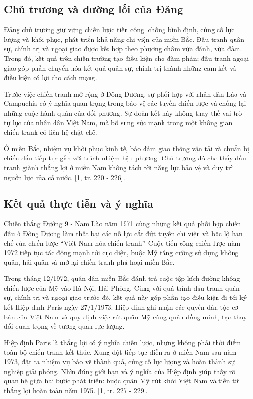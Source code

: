 \subsection{Chủ trương và đường lối của Đảng}

Đảng chủ trương giữ vững chiến lược tiến công, chống bình định, củng cố lực lượng và khôi phục, phát triển khả năng chi viện của miền Bắc. Đấu tranh quân sự, chính trị và ngoại giao được kết hợp theo phương châm vừa đánh, vừa đàm. Trong đó, kết quả trên chiến trường tạo điều kiện cho đàm phán; đấu tranh ngoại giao góp phần chuyển hóa kết quả quân sự, chính trị thành những cam kết và điều kiện có lợi cho cách mạng.

Trước việc chiến tranh mở rộng ở Đông Dương, sự phối hợp với nhân dân Lào và Campuchia có ý nghĩa quan trọng trong bảo vệ các tuyến chiến lược và chống lại những cuộc hành quân của đối phương. Sự đoàn kết này không thay thế vai trò tự lực của nhân dân Việt Nam, mà bổ sung sức mạnh trong một không gian chiến tranh có liên hệ chặt chẽ.

Ở miền Bắc, nhiệm vụ khôi phục kinh tế, bảo đảm giao thông vận tải và chuẩn bị chiến đấu tiếp tục gắn với trách nhiệm hậu phương. Chủ trương đó cho thấy đấu tranh giành thắng lợi ở miền Nam không tách rời năng lực bảo vệ và duy trì nguồn lực của cả nước. [1, tr. 220 - 226].

\subsection{Kết quả thực tiễn và ý nghĩa}

Chiến thắng Đường 9 - Nam Lào năm 1971 cùng những kết quả phối hợp chiến đấu ở Đông Dương làm thất bại các nỗ lực cắt đứt tuyến chi viện và bộc lộ hạn chế của chiến lược “Việt Nam hóa chiến tranh”. Cuộc tiến công chiến lược năm 1972 tiếp tục tác động mạnh tới cục diện, buộc Mỹ tăng cường sử dụng không quân, hải quân và mở lại chiến tranh phá hoại miền Bắc.

Trong tháng 12/1972, quân dân miền Bắc đánh trả cuộc tập kích đường không chiến lược của Mỹ vào Hà Nội, Hải Phòng. Cùng với quá trình đấu tranh quân sự, chính trị và ngoại giao trước đó, kết quả này góp phần tạo điều kiện đi tới ký kết Hiệp định Paris ngày 27/1/1973. Hiệp định ghi nhận các quyền dân tộc cơ bản của Việt Nam và quy định việc rút quân Mỹ cùng quân đồng minh, tạo thay đổi quan trọng về tương quan lực lượng.

Hiệp định Paris là thắng lợi có ý nghĩa chiến lược, nhưng không phải thời điểm toàn bộ chiến tranh kết thúc. Xung đột tiếp tục diễn ra ở miền Nam sau năm 1973, đặt ra nhiệm vụ bảo vệ thành quả, củng cố lực lượng và hoàn thành sự nghiệp giải phóng. Nhìn đúng giới hạn và ý nghĩa của Hiệp định giúp thấy rõ quan hệ giữa hai bước phát triển: buộc quân Mỹ rút khỏi Việt Nam và tiến tới thắng lợi hoàn toàn năm 1975. [1, tr. 227 - 229].

